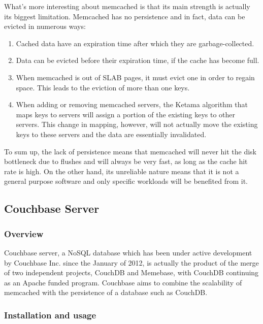 What's more interesting about memcached is that its main strength is actually 
its biggest limitation. Memcached has no persistence and in fact, data can be 
evicted in numerous ways:

\begin{enumerate}
	\item Cached data have an expiration time after which they are 
		garbage-collected.
	\item Data can be evicted before their expiration time, if the cache has 
		become full.
	\item When memcached is out of SLAB pages, it must evict one in order to 
		regain space. This leads to the eviction of more than one keys.
	\item When adding or removing memcached servers, the Ketama algorithm that 
		maps keys to servers will assign a portion of the existing keys to 
		other servers. This change in mapping, however, will not actually move 
		the existing keys to these servers and the data are essentially 
		invalidated.
\end{enumerate}

To sum up, the lack of persistence means that memcached will never hit the disk 
bottleneck due to flushes and will always be very fast, as long as the cache 
hit rate is high. On the other hand, its unreliable nature means that it is not 
a general purpose software and only specific workloads will be benefited from 
it.

\subsection{Couchbase Server}

\subsubsection{Overview}

Couchbase server, a NoSQL database which has been under active development by 
Couchbase Inc.  since the January of 2012, is actually the product of the merge 
of two independent projects, CouchDB and Memebase, with CouchDB continuing as 
an Apache funded program.  Couchbase aims to combine the scalability of 
memcached with the persistence of a database such as CouchDB. 

\subsubsection{Installation and usage}

